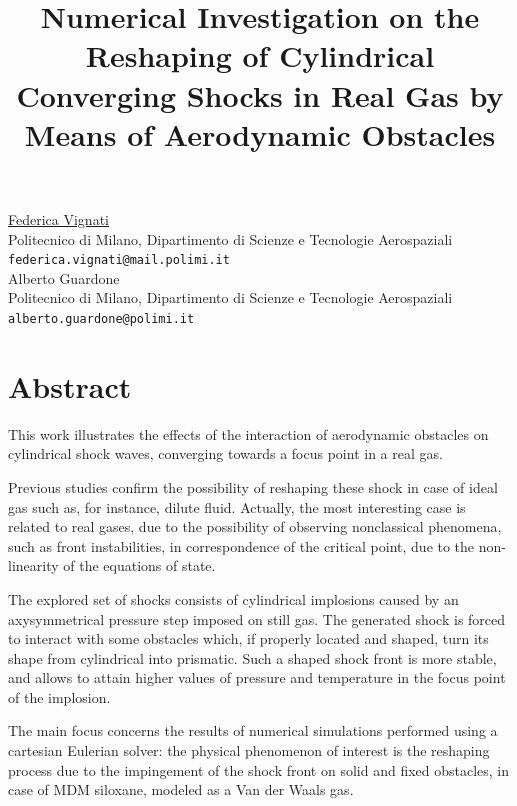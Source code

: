 \documentclass[article,A4,11pt]{llncs}%
\begin{document}
\title{Numerical Investigation on the Reshaping of Cylindrical Converging Shocks in Real Gas by Means of Aerodynamic Obstacles}
 \author{} \institute{}
\maketitle
\begin{center}
{\large \underline{Federica Vignati}}\\
Politecnico di Milano, Dipartimento di Scienze e Tecnologie Aerospaziali\\
{\tt federica.vignati@mail.polimi.it}
\\ \vspace{4mm}
{\large Alberto Guardone}\\
Politecnico di Milano, Dipartimento di Scienze e Tecnologie Aerospaziali\\
{\tt alberto.guardone@polimi.it}
\end{center}

\section*{Abstract}
This work illustrates the effects of the interaction of aerodynamic obstacles on cylindrical shock waves, converging towards a focus point in a real gas.

Previous studies confirm the possibility of reshaping these shock in case of ideal gas such as, for instance, dilute fluid. Actually, the most interesting case is related to real gases, due to the possibility of observing nonclassical phenomena, such as front instabilities, in correspondence of the critical point, due to the non-linearity of the equations of state.

The explored set of shocks consists of cylindrical implosions caused by an axysymmetrical pressure step imposed on still gas. The generated shock is forced to interact with some obstacles which, if properly located and shaped, turn its shape from cylindrical into prismatic. Such a shaped shock front is more stable, and allows to attain higher values of pressure and temperature in the focus point of the implosion.

The main focus concerns the results of numerical simulations performed using a cartesian Eulerian solver: the physical phenomenon of interest is the  reshaping process due to the impingement of the shock front on solid and fixed obstacles, in case of MDM siloxane, modeled as a Van der Waals gas.
\end{document}
